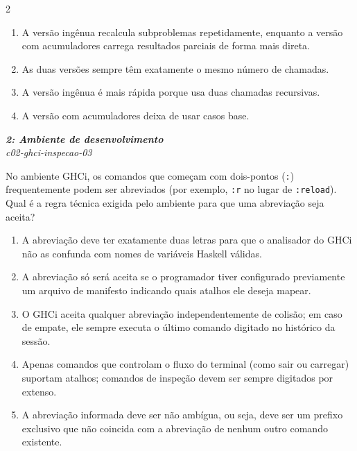 \documentclass[a4paper,10pt,brazil]{article}
\begin{document}
\begin{multicols}{2}
\begin{enumerate}
  \item A versão ingênua recalcula subproblemas repetidamente, enquanto a versão com acumuladores carrega resultados parciais de forma mais direta.

  \item As duas versões sempre têm exatamente o mesmo número de chamadas.

  \item A versão ingênua é mais rápida porque usa duas chamadas recursivas.

  \item A versão com acumuladores deixa de usar casos base.


\end{enumerate}

\begin{flushright}
  \footnotesize
  \textit{\textbf{2: Ambiente de desenvolvimento}}\\
  \textit{c02-ghci-inspecao-03}\\

\end{flushright}
No ambiente GHCi, os comandos que começam com dois-pontos (\texttt{:}) frequentemente podem ser abreviados (por exemplo, \texttt{:r} no lugar de \texttt{:reload}). Qual é a regra técnica exigida pelo ambiente para que uma abreviação seja aceita?

\begin{enumerate}
  \item A abreviação deve ter exatamente duas letras para que o analisador do GHCi não as confunda com nomes de variáveis Haskell válidas.

  \item A abreviação só será aceita se o programador tiver configurado previamente um arquivo de manifesto indicando quais atalhos ele deseja mapear.

  \item O GHCi aceita qualquer abreviação independentemente de colisão; em caso de empate, ele sempre executa o último comando digitado no histórico da sessão.

  \item Apenas comandos que controlam o fluxo do terminal (como sair ou carregar) suportam atalhos; comandos de inspeção devem ser sempre digitados por extenso.

  \item A abreviação informada deve ser não ambígua, ou seja, deve ser um prefixo exclusivo que não coincida com a abreviação de nenhum outro comando existente.



\end{enumerate}
\end{multicols}
\end{document}
